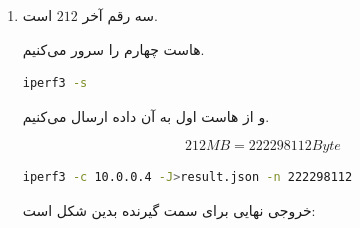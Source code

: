 \documentclass[12pt]{article}
\begin{document}
\begin{enumerate}
	
	\item
	
	سه رقم آخر $212$ است.
	
	هاست چهارم را سرور می‌کنیم.
	
	\begin{latin}
		\begin{lstlisting}[language=bash]
			iperf3 -s
		\end{lstlisting}
	\end{latin}
	
	و از هاست اول به آن داده ارسال می‌کنیم.
	
	$$212 MB = 222298112 Byte$$
	
	
	\begin{latin}
		\begin{lstlisting}[language=bash]
			iperf3 -c 10.0.0.4 -J>result.json -n 222298112 
		\end{lstlisting}
	\end{latin}
	
	خروجی نهایی برای سمت گیرنده بدین شکل است:
	

\end{enumerate}
\end{document}

